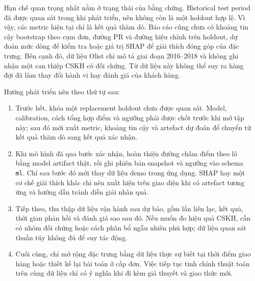 Hạn chế quan trọng nhất nằm ở trạng thái của bằng chứng. Historical test period đã được quan sát trong khi phát triển, nên không còn là một holdout hợp lệ. Vì vậy, các metric hiện tại chỉ là kết quả thăm dò. Báo cáo cũng chưa có khoảng tin cậy bootstrap theo cụm đơn, đường PR và đường hiệu chỉnh trên holdout, dự đoán mức dòng để kiểm tra hoặc giá trị SHAP để giải thích đóng góp của đặc trưng. Bên cạnh đó, dữ liệu Olist chỉ mô tả giai đoạn 2016--2018 và không ghi nhận một can thiệp CSKH có đối chứng. Từ dữ liệu này không thể suy ra hàng đợi đã làm thay đổi hành vi hay đánh giá của khách hàng.

Hướng phát triển nên theo thứ tự sau:
\begin{enumerate}
  \item Trước hết, khóa một replacement holdout chưa được quan sát. Model, calibration, cách tổng hợp điểm và ngưỡng phải được chốt trước khi mở tập này; sau đó mới xuất metric, khoảng tin cậy và artefact dự đoán để chuyển từ kết quả thăm dò sang kết quả xác nhận.
  \item Khi mô hình đã qua bước xác nhận, hoàn thiện đường chấm điểm theo lô bằng model artifact thật, rồi ghi phiên bản snapshot và ngưỡng vào schema \texttt{ml}. Chỉ sau bước đó mới thay dữ liệu demo trong ứng dụng. SHAP hay một cơ chế giải thích khác chỉ nên xuất hiện trên giao diện khi có artefact tương ứng và hướng dẫn tránh diễn giải nhân quả.
  \item Tiếp theo, thu thập dữ liệu vận hành sau dự báo, gồm lần liên lạc, kết quả, thời gian phản hồi và đánh giá sao sau đó. Nếu muốn đo hiệu quả CSKH, cần có nhóm đối chứng hoặc cách phân bổ ngẫu nhiên phù hợp; dữ liệu quan sát thuần túy không đủ để suy tác động.
  \item Cuối cùng, chỉ mở rộng đặc trưng bằng dữ liệu thực sự biết tại thời điểm giao hàng hoặc thiết kế lại bài toán ở cấp đơn. Việc tiếp tục tinh chỉnh thuật toán trên cùng dữ liệu chỉ có ý nghĩa khi đi kèm giả thuyết và giao thức mới.
\end{enumerate}
